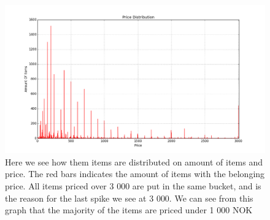



    \begin{figure}[H]
        \includegraphics[width=5in]{image/priceDistribution.png}
        \centering
        \caption[Price distribution of items]{Here we see how them items are distributed on amount of items and price. The red bars indicates the amount of items with the belonging price.
        All items priced over 3 000 are put in the same bucket, and is the reason for the last spike we see at 3 000.
        We can see from this graph that the majority of the items are priced under 1 000 NOK}
        \label{figure:ratingdistr}
    \end{figure}

